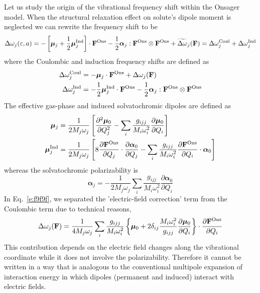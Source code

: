 \documentclass[a4paper,titlepage,twoside,fleqn,12pt]{book}
\newcommand{\BM}[1]{\bm{#1}}
\newcommand{\fderiv}[2]{\ensuremath{
\frac{\partial #1}{\partial #2}}}
\newcommand{\sderiv}[2]{\ensuremath{
\frac{\partial^2 #1}{\partial #2^2}
}}
\begin{document}
\begin{refsection}
Let us study the origin of the vibrational frequency shift
within the Onsager model. 
When the structural relaxation effect on solute's dipole moment
is neglected we can rewrite the frequency shift to be
%
\begin{equation} \label{e:f9f9f}
 \Delta\omega_j(\varepsilon, a) = 
- \left[ {\BM \mu}_j + \frac{1}{2} {\BM \mu}_j^{\rm Ind} \right] \cdot {\bf F}^{\rm Ons} 
- \frac{1}{2} {\BM \alpha}_j : {\bf F}^{\rm Ons} \otimes {\bf F}^{\rm Ons} 
+ \widetilde{\Delta\omega}_j({\bf F})
 = \Delta\omega_j^{\rm Coul} + \Delta\omega_j^{\rm Ind}
\end{equation}
%
where the Coulombic and induction frequency shifts 
are defined as
%
\begin{subequations}
 \begin{align}
   \Delta\omega_j^{\rm Coul}             &= - {\BM \mu}_j \cdot {\bf F}^{\rm Ons} + \Delta\omega_j({\bf F})\\
   \Delta\omega_j^{\rm Ind}              &= - \frac{1}{2} {\BM \mu}_j^{\rm Ind} \cdot {\bf F}^{\rm Ons} 
       - \frac{1}{2} {\BM \alpha}_j : {\bf F}^{\rm Ons} \otimes {\bf F}^{\rm Ons} 
 \end{align}
\end{subequations}
%
The effective gas\hyp{}phase and induced solvatochromic dipoles
are defined as
%
\begin{subequations}
 \begin{align}
   {\BM \mu}_j &= \frac{1}{2M_j\omega_j}
\left[  \sderiv{{\BM\mu}_0}{Q_j}
- \sum_i \frac{g_{ijj}}{M_i\omega_i^2} \fderiv{{\BM\mu}_0}{Q_i}
\right] \\
   {\BM \mu}_j^{\rm Ind} &= \frac{1}{2M_j\omega_j} 
\left[ 8 \fderiv{{\bf F}^{\rm Ons}}{Q_j} \cdot \fderiv{{\BM\alpha}_0}{Q_j} - 
   \sum_i \frac{g_{ijj}}{M_i\omega_i^2} \fderiv{{\bf F}^{\rm Ons}}{Q_i} \cdot {\BM\alpha}_0
\right]
 \end{align}
\end{subequations}
%
whereas the solvatochromic polarizability is
%
\begin{equation} 
  {\BM \alpha}_j = - \frac{1}{2M_j\omega_j} 
   \sum_i \frac{g_{ijj}}{M_i\omega_i^2} \fderiv{{\BM\alpha}_0}{Q_i}
\end{equation}
%
In Eq.~\eqref{e:f9f9f}, we separated the 'electric\hyp{}field correction'
term from the Coulombic term due to technical reasons,
%
\begin{equation} 
\Delta\omega_j({\bf F}) = \frac{1}{4M_j\omega_j}
\sum_i \frac{g_{ijj}}{M_i\omega_i^2} \left\{ {\BM\mu}_0 + 
2\delta_{ij}\frac{M_i\omega_i^2}{g_{ijj}}\fderiv{{\BM\mu}_0}{Q_i}\right\} \cdot \fderiv{{\bf F}^{\rm Ons}}{Q_i}
\end{equation}
%
This contribution depends on the electric field changes along the vibrational
coordinate while it does not involve the polarizability. Therefore
it cannot be written in a way that is analogous
to the conventional multipole expansion of interaction energy 
in which dipoles (permanent and induced) interact with electric fields.


\end{refsection}
\end{document}
